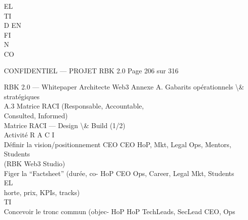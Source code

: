 \vspace{0.5em}
EL\\
TI\\
D  EN\\
FI\\
N\\
CO\\
\vspace{0.5em}
\vspace{0.5em}
\vspace{0.5em}
\vspace{0.5em}
\begin{confidential}CONFIDENTIEL — PROJET RBK 2.0                                 Page 206 sur 316\end{confidential}
RBK 2.0 — Whitepaper Architecte Web3                                                    Annexe A. Gabarits opérationnels \textbackslash{}& stratégiques\\
\vspace{0.5em}
\vspace{0.5em}
\vspace{0.5em}
A.3     Matrice RACI (Responsable, Accountable,\\
Consulted, Informed)\\
Matrice RACI — Design \textbackslash{}& Build (1/2)\\
\vspace{0.5em}
\vspace{0.5em}
Activité                             R                A                C                           I\\
Définir la vision/positionnement     CEO              CEO              HoP, Mkt, Legal             Ops, Mentors, Students\\
(RBK Web3 Studio)\\
Figer la “Factsheet” (durée, co-     HoP              CEO              Ops, Career, Legal          Mkt, Students\\
\vspace{0.5em}
\vspace{0.5em}
\vspace{0.5em}
\vspace{0.5em}
EL\\
horte, prix, KPIs, tracks)\\
\vspace{0.5em}
\vspace{0.5em}
\vspace{0.5em}
\vspace{0.5em}
TI\\
Concevoir le tronc commun (objec- HoP                 HoP              TechLeads, SecLead          CEO, Ops\\
